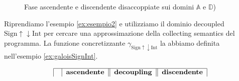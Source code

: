 \begin{figure}[H]
    \centering
    \caption{Fase ascendente e discendente disaccoppiate sui domini \(\mathbb{A}\) e \(\mathbb{D}\))}
    \label{fig:decFig}
\end{figure}

\begin{example}
Riprendiamo l'esempio \ref{ex:esempio2} e utilizziamo il dominio decoupled \(\textrm{Sign}\uparrow\downarrow\textrm{Int}\) per cercare una approssimazione della collecting semantics del programma. La funzione concretizzante \(\gamma_{\textrm{Sign}\uparrow\downarrow\textrm{Int}}\) la abbiamo definita nell'esempio \ref{ex:galoisSignInt}. 
\begin{figure}[H]
\begin{minipage}{\textwidth}
    \centering
    \vspace{1cm}
        \[
        \begin{tabular}{|c|c|c|c||c||c|c|c||}
        \hline
        \multicolumn{2}{|c|}{} & 
        \multicolumn{2}{c||}{\textbf{ascendente}} & 
        \multicolumn{1}{c||}{\textbf{decoupling}} & 
        \multicolumn{2}{c|}{\textbf{discendente}}\\
        

\end{tabular}\]
\end{minipage}
\end{figure}
\end{example}
